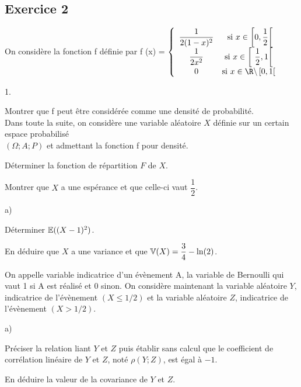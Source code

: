 \documentclass[11pt]{article}%
\begin{document}
\subsection*{Exercice 2}

On considère la fonction f définie par f (x) = $\left\{ 
\begin{array}{cc}
\dfrac{1}{2(1-x)^{2}} & \text{si }x\in \left[ 0,\dfrac{1}{2}\right[
\\
\dfrac{1}{2x^{2}} & \text{si }x\in \left[ \ \dfrac{1}{2},1\right[ \ 
\\
0 & \text{si }x\in \R\backslash \left[ 0,1\right[ \ 
\end{array}
\right. $ 

\begin{noliste}{1.}
 \setlength{\itemsep}{4mm}
\item Montrer que f peut être considérée comme une densité de
probabilité.
\\
Dans toute la suite, on considère une variable aléatoire $X$ définie
sur un
certain espace probabilisé \\
$(\Omega ;A;P)$ et admettant la fonction f pour densité.

\item Déterminer la fonction de répartition $F$ de $X$.

\item Montrer que $X$ a une espérance et que celle-ci vaut
$\dfrac{1}{2}$.

\item 

\begin{noliste}{a)}
 \setlength{\itemsep}{2mm}
\item Déterminer $\mathbb{E}((X-1)^{2})$.

\item En déduire que $X$ a une variance et que $\mathbb{V}(X) =
\dfrac{3}{4}-\ln (2)$.
\end{noliste}

\item On appelle variable indicatrice d'un évènement A, la variable de
Bernoulli qui vaut 1 si A est réalisé et 0 sinon. On considère
maintenant la
variable aléatoire $Y$, indicatrice de l'évènement $(X\leq 1/2)$ et la
variable aléatoire $Z$, indicatrice de l'évènement $(X>1/2)$.

\begin{noliste}{a)}
 \setlength{\itemsep}{2mm}
\item Préciser la relation liant $Y$ et $Z$ puis établir sans calcul
que le
coefficient de corrélation linéaire de $Y$ et $Z$, noté $\rho (Y;Z)$,
est égal à $-1.$

\item En déduire la valeur de la covariance de $Y$ et $Z$.
\end{noliste}
\end{noliste}
\end{document}
